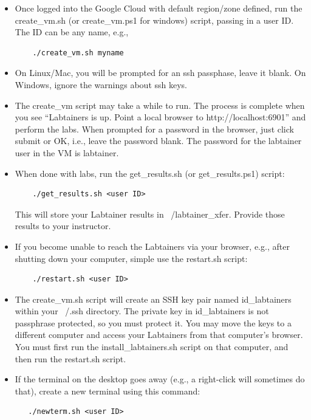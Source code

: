 \documentclass[12pt]{article}
\begin{document}
\begin{itemize}
\item Once logged into the Google Cloud with default region/zone defined, run the create\_vm.sh (or create\_vm.ps1 for windows) script, passing in a user ID.
The ID can be any name, e.g.,
\begin{verbatim}
    ./create_vm.sh myname
\end{verbatim}

\item On Linux/Mac, you will be prompted for an ssh passphase, leave it blank.  On Windows, ignore the warnings
about ssh keys.

\item The create\_vm script may take a while to run.  The process is complete when you see “Labtainers is up.  
Point a local browser to http://localhost:6901” and perform the labs.
When prompted for a password in the browser, just click submit or OK, i.e., leave the password blank.
The password for the labtainer user in the VM is labtainer.  

\item When done with labs, run the get\_results.sh (or get\_results.ps1) script: 
\begin{verbatim}
    ./get_results.sh <user ID>
\end{verbatim}
\noindent This will store your Labtainer results in ~/labtainer\_xfer.  Provide those
results to your instructor.

\item If you become unable to reach the Labtainers via your browser, e.g., after 
shutting down your computer, simple use the restart.sh script:
\begin{verbatim}
    ./restart.sh <user ID>
\end{verbatim}

\item The create\_vm.sh script will create an SSH key pair named id\_labtainers within your ~/.ssh directory.
The private key in id\_labtainers is not passphrase protected, so you must protect it.
You may move the keys to a different computer and access your Labtainers from that computer's
browser.  You must first run the install\_labtainers.sh script on that computer, and then run
the restart.sh script.

\item If the terminal on the desktop goes away (e.g., a right-click will sometimes do that), create a new
terminal using this command:
\begin{verbatim}
   ./newterm.sh <user ID>
\end{verbatim}


\end{itemize}
\end{document}
